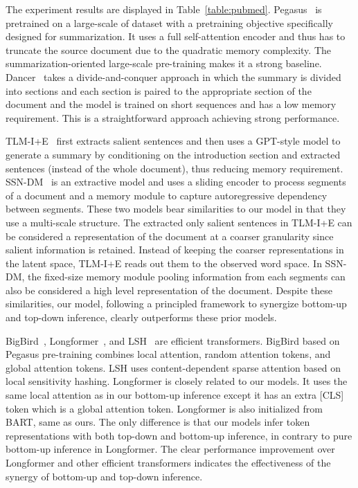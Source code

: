 \documentclass{article} \usepackage{iclr2022_conference,times}
\begin{document}
The experiment results are displayed in Table~\ref{table:pubmed}. Pegasus~\citep{zhang2020pegasus} is pretrained on a large-scale of dataset with a pretraining objective specifically designed for summarization. It uses a full self-attention encoder and thus has to truncate the source document due to the quadratic memory complexity. The summarization-oriented large-scale pre-training makes it a strong baseline. Dancer~\citep{gidiotis2020divide} takes a divide-and-conquer approach in which the summary is divided into sections and each section is paired to the appropriate section of the document and the model is trained on short sequences and has a low memory requirement. This is a straightforward approach achieving strong performance.


TLM-I+E~\citep{pilault-etal-2020-extractive} first extracts salient sentences and then uses a GPT-style model to generate a summary by conditioning on the introduction section and extracted sentences (instead of the whole document), thus reducing memory requirement. SSN-DM~\citep{cui-hu-2021-sliding} is an extractive model and uses a sliding encoder to process segments of a document and a memory module to capture autoregressive dependency between segments. These two models bear similarities to our model in that they use a multi-scale structure. The extracted only salient sentences in TLM-I+E can be considered a representation of the document at a coarser granularity since salient information is retained. Instead of keeping the coarser representations in the latent space, TLM-I+E reads out them to the observed word space. In SSN-DM, the fixed-size memory module pooling information from each segments can also be considered a high level representation of the document. Despite these similarities, our model, following a principled framework to synergize bottom-up and top-down inference, clearly outperforms these prior models.  

BigBird~\citep{zaheer2020big}, Longformer~\citep{beltagy2020longformer}, and LSH~\citep{kitaev2020reformer, huang-etal-2021-efficient} are efficient transformers. BigBird based on Pegasus pre-training combines local attention, random attention tokens, and global attention tokens. LSH uses content-dependent sparse attention based on local sensitivity hashing. Longformer is closely related to our models. It uses the same local attention as in our bottom-up inference except it has an extra [CLS] token which is a global attention token. Longformer is also initialized from BART, same as ours. The only difference is that our models infer token representations with both top-down and bottom-up inference, in contrary to pure bottom-up inference in Longformer. The clear performance improvement over Longformer and other efficient transformers indicates the effectiveness of the synergy of bottom-up and top-down inference.   
\end{document}
